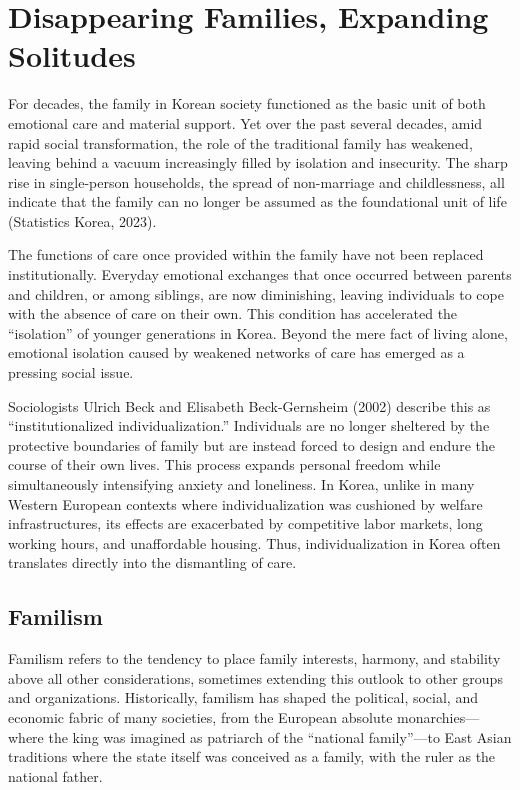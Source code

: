 \chapter{Disappearing Families, Expanding Solitudes}

For decades, the family in Korean society functioned as the basic unit of both emotional care and material support. Yet over the past several decades, amid rapid social transformation, the role of the traditional family has weakened, leaving behind a vacuum increasingly filled by isolation and insecurity. The sharp rise in single-person households, the spread of non-marriage and childlessness, all indicate that the family can no longer be assumed as the foundational unit of life (Statistics Korea, 2023).  

The functions of care once provided within the family have not been replaced institutionally. Everyday emotional exchanges that once occurred between parents and children, or among siblings, are now diminishing, leaving individuals to cope with the absence of care on their own. This condition has accelerated the “isolation” of younger generations in Korea. Beyond the mere fact of living alone, emotional isolation caused by weakened networks of care has emerged as a pressing social issue.  

Sociologists Ulrich Beck and Elisabeth Beck-Gernsheim (2002) describe this as “institutionalized individualization.” Individuals are no longer sheltered by the protective boundaries of family but are instead forced to design and endure the course of their own lives. This process expands personal freedom while simultaneously intensifying anxiety and loneliness. In Korea, unlike in many Western European contexts where individualization was cushioned by welfare infrastructures, its effects are exacerbated by competitive labor markets, long working hours, and unaffordable housing. Thus, individualization in Korea often translates directly into the dismantling of care.  

\section{Familism}

Familism refers to the tendency to place family interests, harmony, and stability above all other considerations, sometimes extending this outlook to other groups and organizations. Historically, familism has shaped the political, social, and economic fabric of many societies, from the European absolute monarchies—where the king was imagined as patriarch of the “national family”—to East Asian traditions where the state itself was conceived as a family, with the ruler as the national father.  

